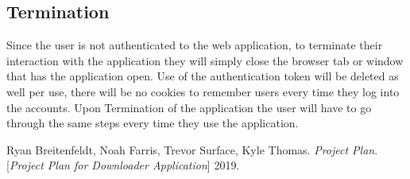 \documentclass{article}
\begin{document}
        \subsection{Termination}
        Since the user is not authenticated to the web application, to terminate their interaction with the application they will simply close the browser tab or window that has the
        application open. Use of the authentication token will be deleted as well per use, there will be no cookies to remember users every time they log into the accounts. Upon Termination
        of the application the user will have to go through the same steps every time they use the application.


        \newpage
        \begin{thebibliography}{1}
        Ryan Breitenfeldt, Noah Farris, Trevor Surface, Kyle Thomas.
        \textit{Project Plan}.
        [\textit{Project Plan for Downloader Application}] 2019.
        \end{thebibliography}



\end{document}
